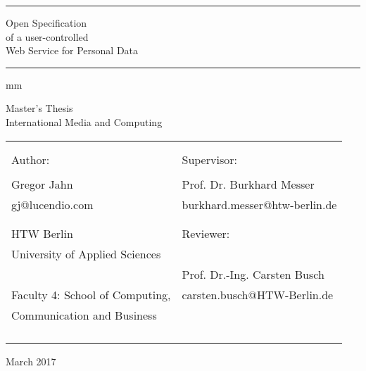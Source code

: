 \begin{titlepage}
    \begin{centering}
        \hrule\par\rule[-0.65em]{0pt}{2.8em}
        {\Huge Open Specification  \\ of a user-controlled \\ Web Service for Personal Data \\ \(\ \)}
        \hrule\par\rule{0pt}{1.35em}
         mm
        \begin{Large} Master’s Thesis \\ International Media and Computing \\
        \end{Large}
    \end{centering}
    \vskip 35mm
    \begin{table}[h]\centering
        \begin{tabularx}{1.1\textwidth}{ X X } %
                                            &  \\       %
                                            &  \\       %
            Author:                         & Supervisor:                   \\
            \tiny                           & \tiny                         \\
            Gregor Jahn                     & Prof. Dr. Burkhard Messer     \\
            gj@lucendio.com                 & burkhard.messer@htw-berlin.de \\
                                            &  \\
                                            &  \\
            HTW Berlin                      & Reviewer:                     \\
            University of Applied Sciences  &                               \\
                                            & Prof. Dr.-Ing. Carsten Busch  \\
            Faculty 4: School of Computing, & carsten.busch@HTW-Berlin.de   \\
            Communication and Business      &  \\
                                            &  \\
                                            &  \\
                                            &  \\
                                            &  \\
        \end{tabularx}
    \end{table}
    \begin{center}March 2017\end{center}
\end{titlepage}
